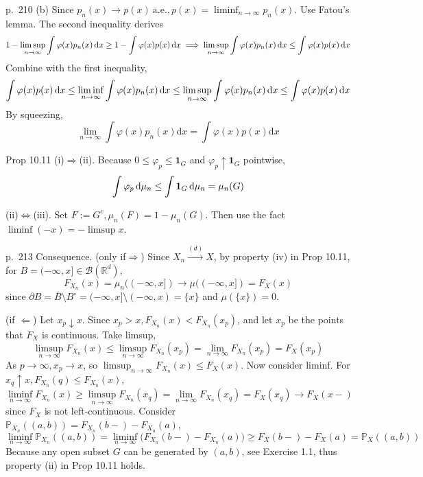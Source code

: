 \begin{note}{p.~210}
    (b) Since $p_n(x)\to p(x)\ \text{a.e.}, p(x)=\liminf_{n\to\infty}p_n(x)$. Use Fatou's lemma. The second inequality derives
    \[
    1-\limsup_{n\to\infty}\int\varphi(x)p_n(x)\mathop{}\!\mathrm{d} x\ge 1-\int \varphi(x)p(x)\mathop{}\!\mathrm{d} x\implies \limsup_{n\to\infty}\int\varphi(x)p_n(x)\mathop{}\!\mathrm{d} x\le \int \varphi(x)p(x)\mathop{}\!\mathrm{d} x
    \]
    Combine with the first inequality, 
    \[
    \int \varphi(x)p(x)\mathop{}\!\mathrm{d} x\le \liminf_{n\to\infty}\int\varphi(x)p_n(x)\mathop{}\!\mathrm{d} x\le
    \limsup_{n\to\infty}\int\varphi(x)p_n(x)\mathop{}\!\mathrm{d} x\le \int \varphi(x)p(x)\mathop{}\!\mathrm{d} x
    \]
    By squeezing,
    \[
    \lim _{n \rightarrow \infty} \int \varphi(x) p_{n}(x) \mathrm{d} x=\int \varphi(x) p(x) \mathrm{d} x
    \]
\end{note}

\begin{note}{Prop 10.11}
    (i)$\Rightarrow$(ii). Because $0\le\varphi_p\le \mathbf{1}_G$ and $\varphi_p\uparrow \mathbf{1}_G$ pointwise, 
    \[
    \int \varphi_{p} \mathop{}\!\mathrm{d} \mu_{n} \leq \int \mathbf{1}_{G} \mathop{}\!\mathrm{d}\mu_{n}=\mu_{n}(G) 
    \]

    (ii)$\Leftrightarrow$(iii). Set $F:=G^c, \mu_n(F)=1-\mu_n(G)$. Then use the fact $\liminf(-x)=-\limsup x$. 
\end{note}

\begin{note}{p.~213}
    Consequence. (only if$\Rightarrow$) Since $X_n\xrightarrow{(d)}X$, by property (iv) in Prop 10.11, for $B=(-\infty,x]\in\mathcal{B}(\mathbb{R}^d)$,
    \[
    F_{X_n}(x)=\mu_n((-\infty,x])\to\mu((-\infty,x])=F_X(x)
    \]
    since $\partial B=\bar{B}\setminus B^{\circ}=(-\infty,x]\setminus(-\infty,x)=\{x\}$ and $\mu(\{x\})=0$.

    (if $\Leftarrow$) Let $x_p\downarrow x$. Since $x_p>x, F_{X_n}(x)<F_{X_n}(x_p)$, and let $x_p$ be the points that $F_X$ is continuous. Take limsup,
    \[
    \limsup_{n\to\infty} F_{X_n}(x)\le\limsup_{n\to\infty}F_{X_n}(x_p)=\lim_{n\to\infty}F_{X_n}(x_p)=F_X(x_p)
    \]
    As $p\to\infty, x_p\to x$, so $\limsup_{n\to\infty}F_{X_n}(x)\le F_X(x).$ Now consider liminf. For $x_q\uparrow x, F_{X_n}(q)\le F_{X_n}(x)$,
    \[
    \liminf_{n\to\infty} F_{X_n}(x)\ge\limsup_{n\to\infty}F_{X_n}(x_q)=\lim_{n\to\infty}F_{X_n}(x_q)=F_X(x_q)\to F_X(x-)
    \]
    since $F_X$ is not left-continuous. Consider $\mathbb{P}_{X_n}((a,b))=F_{X_n}(b-)-F_{X_n}(a)$,
    \[
    \liminf_{n\to\infty} \mathbb{P}_{X_n}((a,b)) 
    = \liminf_{n\to\infty} \big( F_{X_n}(b-) - F_{X_n}(a) \big) \geq F_X(b-) - F_X(a) 
    = \mathbb{P}_X((a,b))
    \]
    Because any open subset $G$ can be generated by $(a,b)$, see Exercise 1.1, thus property (ii) in Prop 10.11 holds.
\end{note}

